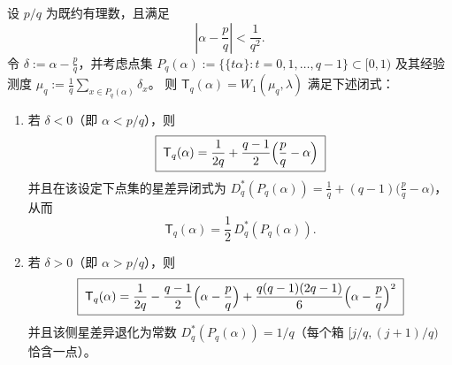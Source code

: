 \begin{theorem}\label{thm:kronecker-w1-denominator-closed-form}
设 \(p/q\) 为既约有理数，且满足
\[
\left|\alpha-\frac pq\right|<\frac1{q^2}.
\]
令 \(\delta:=\alpha-\frac pq\)，并考虑点集
\(
P_q(\alpha):=\{\{t\alpha\}:t=0,1,\dots,q-1\}\subset[0,1)
\)
及其经验测度 \(\mu_q:=\frac1q\sum_{x\in P_q(\alpha)}\delta_x\)。
则 \(\mathsf{T}_q(\alpha)=W_1(\mu_q,\lambda)\) 满足下述闭式：
\begin{enumerate}
  \item 若 \(\delta<0\)（即 \(\alpha<p/q\)），则
  \begin{equation}\label{eq:kronecker-w1-bad-side-linear}
  \boxed{\;
  \mathsf{T}_q(\alpha)=\frac1{2q}+\frac{q-1}{2}\Bigl(\frac pq-\alpha\Bigr)\;}
  \end{equation}
  并且在该设定下点集的星差异闭式为
  \(
  D_q^\ast(P_q(\alpha))=\frac1q+(q-1)\bigl(\frac pq-\alpha\bigr)
  \)，从而
  \begin{equation}\label{eq:kronecker-w1-half-star}
  \boxed{\;\mathsf{T}_q(\alpha)=\frac12\,D_q^\ast(P_q(\alpha)).\;}
  \end{equation}
  \item 若 \(\delta>0\)（即 \(\alpha>p/q\)），则
  \begin{equation}\label{eq:kronecker-w1-good-side-quadratic}
  \boxed{\;
  \mathsf{T}_q(\alpha)=\frac1{2q}-\frac{q-1}{2}\Bigl(\alpha-\frac pq\Bigr)
  +\frac{q(q-1)(2q-1)}6\Bigl(\alpha-\frac pq\Bigr)^2\;}
  \end{equation}
  并且该侧星差异退化为常数 \(D_q^\ast(P_q(\alpha))=1/q\)（每个箱 \([j/q,(j+1)/q)\) 恰含一点）。
\end{enumerate}
\end{theorem}
